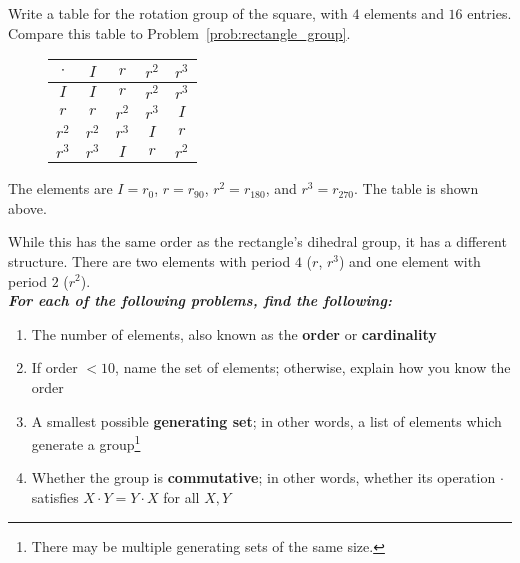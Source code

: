 \documentclass[../key.tex]{subfiles}
\begin{document}
\begin{outer_problem}
\item Write a table for the rotation group of the square, with $4$ elements and $16$ entries. Compare this table to Problem~\ref{prob:rectangle_group}.
\end{outer_problem}

\begin{figure}[h]
	\begin{center}
		\begin{minipage}[b]{\textwidth}
			\centering
			\begin{tabular}{c|cccc}
				\hline
				$\cdot$ & $I$ & $r$ & $r^2$ & $r^3$ \\ \hline
				\rowcolor{light-gray}
				$I$ & $I$ & $r$ & $r^2$ & $r^3$ \\
				$r$ & $r$ & $r^2$ & $r^3$ & $I$ \\
				\rowcolor{light-gray}
				$r^2$ & $r^2$ & $r^3$ & $I$ & $r$ \\
				$r^3$ & $r^3$ & $I$ & $r$ & $r^2$ \\ \hline
			\end{tabular}
			\vspace*{0.5\baselineskip}
		\end{minipage}
	\end{center}
	\vspace*{-2\baselineskip}
\end{figure}%

\noindent The elements are $I=r_0$, $r=r_{90}$, $r^2=r_{180}$, and $r^3=r_{270}$. The table is shown above.

While this has the same order as the rectangle's dihedral group, it has a different structure. There are two elements with period $4$ ($r$, $r^3$) and one element with period $2$ ($r^2$).\\

\noindent\textbf{\textit{For each of the following problems, find the following:}}

\begin{enumerate}[label=(\alph*)]
\item The number of elements, also known as the \textbf{order} or \textbf{cardinality}
\item If order $< 10$, name the set of elements; otherwise, explain how you know the order
\item A smallest possible \textbf{generating set}; in other words, a list of elements which generate a group\footnote{There may be multiple generating sets of the same size.}
\item Whether the group is \textbf{commutative}; in other words, whether its operation $\cdot$ satisfies $X\cdot Y=Y\cdot X$ for all $X,Y$
\end{enumerate}
\end{document}
